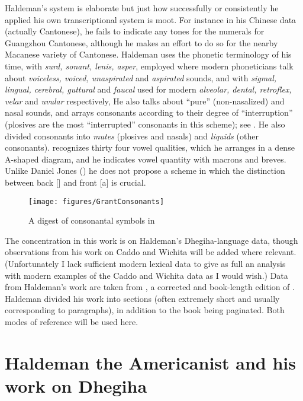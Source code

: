 \documentclass[output=paper]{LSP/langsci}
\begin{document}
Haldeman's system is elaborate but just how successfully or consistently he applied his own transcriptional system is moot. For instance in his Chinese data (actually Cantonese), he fails to indicate any tones for the numerals for Guangzhou Cantonese, although he makes an effort to do so for  the nearby Macanese variety of Cantonese.  Haldeman uses the phonetic terminology of his time, with \textit{surd, sonant, lenis, asper}, employed where modern phoneticians talk about \textit{voiceless, voiced, unaspirated} and \textit{aspirated} sounds, and with \textit{sigmal, lingual, cerebral, guttural} and \textit{faucal} used for modern \textit{alveolar, dental, retroflex, velar} and \textit{uvular} respectively,    He also talks about ``pure'' (non-nasalized) and  nasal  sounds, and arrays consonants according to their degree of ``interruption'' (plosives are the most ``interrupted'' consonants in this scheme); see .   He also divided consonants into \textit{mutes} (plosives and nasals) and \textit{liquids} (other consonants).  \citet[83, 369]{Haldeman1860} recognizes thirty four vowel qualities, which he arranges in a dense A-shaped diagram, and he indicates vowel quantity with macrons and breves.   Unlike Daniel Jones (\citealt{Jones1909}) he does not propose a scheme in which the distinction between back [] and front [a] is crucial.  

\begin{figure} 
\caption{A digest of consonantal symbols in \citealt[121: \S576]{Haldeman1860}} \label{haldemandigest}
\texttt{[image: figures/GrantConsonants]}
\end{figure}

The concentration in this work is on Haldeman's Dhegiha-language data, though observations from his work on Caddo and Wichita will be added where relevant. (Unfortunately I lack sufficient modern lexical data to give as full an analysis with modern examples of the Caddo and Wichita data as I would wish.)   Data from Haldeman's work are taken from \citet{Haldeman1860}, a corrected and book-length edition of \citet{Haldeman1859}.  Haldeman divided his work into sections (often extremely short and usually corresponding to paragraphs), in addition to the book being paginated.  Both modes of reference will be used here.  

\section{Haldeman the Americanist and his work on Dhegiha}  
\end{document}

